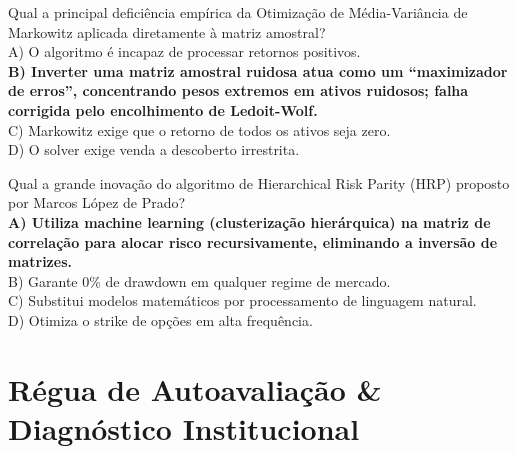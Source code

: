 \documentclass[11pt,a4paper]{article}
\begin{document}
\begin{infobox}
Qual a principal deficiência empírica da Otimização de Média-Variância de Markowitz aplicada diretamente à matriz amostral?\\
A) O algoritmo é incapaz de processar retornos positivos.\\
\textbf{B) Inverter uma matriz amostral ruidosa atua como um ``maximizador de erros'', concentrando pesos extremos em ativos ruidosos; falha corrigida pelo encolhimento de Ledoit-Wolf.}\\
C) Markowitz exige que o retorno de todos os ativos seja zero.\\
D) O solver exige venda a descoberto irrestrita.
\end{infobox}

\begin{infobox}
Qual a grande inovação do algoritmo de Hierarchical Risk Parity (HRP) proposto por Marcos López de Prado?\\
\textbf{A) Utiliza machine learning (clusterização hierárquica) na matriz de correlação para alocar risco recursivamente, eliminando a inversão de matrizes.}\\
B) Garante 0\% de drawdown em qualquer regime de mercado.\\
C) Substitui modelos matemáticos por processamento de linguagem natural.\\
D) Otimiza o strike de opções em alta frequência.
\end{infobox}

\vspace{10pt}

\section{Régua de Autoavaliação \& Diagnóstico Institucional}
\end{document}
